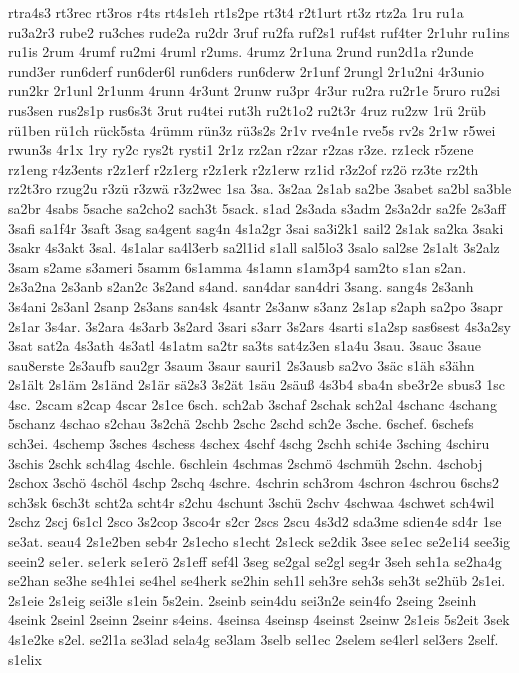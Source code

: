 {rtra4s3
rt3rec
rt3ros
r4ts
rt4s1eh
rt1s2pe
rt3t4
r2t1urt
rt3z
rtz2a
1ru
ru1a
ru3a2r3
rube2
ru3ches
rude2a
ru2dr
3ruf
ru2fa
ruf2s1
ruf4st
ruf4ter
2r1uhr
ru1ins
ru1is
2rum
4rumf
ru2mi
4ruml
r2ums.
4rumz
2r1una
2rund
run2d1a
r2unde
rund3er
run6derf
run6der6l
run6ders
run6derw
2r1unf
2rungl
2r1u2ni
4r3unio
run2kr
2r1unl
2r1unm
4runn
4r3unt
2runw
ru3pr
4r3ur
ru2ra
ru2r1e
5ruro
ru2si
rus3sen
rus2s1p
rus6s3t
3rut
ru4tei
rut3h
ru2t1o2
ru2t3r
4ruz
ru2zw
1rü
2rüb
rü1ben
rü1ch
rück5sta
4rümm
rün3z
rü3s2s
2r1v
rve4n1e
rve5s
rv2s
2r1w
r5wei
rwun3s
4r1x
1ry
ry2c
rys2t
rysti1
2r1z
rz2an
r2zar
r2zas
r3ze.
rz1eck
r5zene
rz1eng
r4z3ents
r2z1erf
r2z1erg
r2z1erk
r2z1erw
rz1id
r3z2of
rz2ö
rz3te
rz2th
rz2t3ro
rzug2u
r3zü
r3zwä
r3z2wec
1sa
3sa.
3s2aa
2s1ab
sa2be
3sabet
sa2bl
sa3ble
sa2br
4sabs
5sache
sa2cho2
sach3t
5sack.
s1ad
2s3ada
s3adm
2s3a2dr
sa2fe
2s3aff
3safi
sa1f4r
3saft
3sag
sa4gent
sag4n
4s1a2gr
3sai
sa3i2k1
sail2
2s1ak
sa2ka
3saki
3sakr
4s3akt
3sal.
4s1alar
sa4l3erb
sa2l1id
s1all
sal5lo3
3salo
sal2se
2s1alt
3s2alz
3sam
s2ame
s3ameri
5samm
6s1amma
4s1amn
s1am3p4
sam2to
s1an
s2an.
2s3a2na
2s3anb
s2an2c
3s2and
s4and.
san4dar
san4dri
3sang.
sang4s
2s3anh
3s4ani
2s3anl
2sanp
2s3ans
san4sk
4santr
2s3anw
s3anz
2s1ap
s2aph
sa2po
3sapr
2s1ar
3s4ar.
3s2ara
4s3arb
3s2ard
3sari
s3arr
3s2ars
4sarti
s1a2sp
sas6sest
4s3a2sy
3sat
sat2a
4s3ath
4s3atl
4s1atm
sa2tr
sa3ts
sat4z3en
s1a4u
3sau.
3sauc
3saue
sau8erste
2s3aufb
sau2gr
3saum
3saur
sauri1
2s3ausb
sa2vo
3säc
s1äh
s3ähn
2s1ält
2s1äm
2s1änd
2s1är
sä2s3
3s2ät
1säu
2säuß
4s3b4
sba4n
sbe3r2e
sbus3
1sc
4sc.
2scam
s2cap
4scar
2s1ce
6sch.
sch2ab
3schaf
2schak
sch2al
4schanc
4schang
5schanz
4schao
s2chau
3s2chä
2schb
2schc
2schd
sch2e
3sche.
6schef.
6schefs
sch3ei.
4schemp
3sches
4schess
4schex
4schf
4schg
2schh
schi4e
3sching
4schiru
3schis
2schk
sch4lag
4schle.
6schlein
4schmas
2schmö
4schmüh
2schn.
4schobj
2schox
3schö
4schöl
4schp
2schq
4schre.
4schrin
sch3rom
4schron
4schrou
6schs2
sch3sk
6sch3t
scht2a
scht4r
s2chu
4schunt
3schü
2schv
4schwaa
4schwet
sch4wil
2schz
2scj
6s1cl
2sco
3s2cop
3sco4r
s2cr
2scs
2scu
4s3d2
sda3me
sdien4e
sd4r
1se
se3at.
seau4
2s1e2ben
seb4r
2s1echo
s1echt
2s1eck
se2dik
3see
se1ec
se2e1i4
see3ig
seein2
se1er.
se1erk
se1erö
2s1eff
sef4l
3seg
se2gal
se2gl
seg4r
3seh
seh1a
se2ha4g
se2han
se3he
se4h1ei
se4hel
se4herk
se2hin
seh1l
seh3re
seh3s
seh3t
se2hüb
2s1ei.
2s1eie
2s1eig
sei3le
s1ein
5s2ein.
2seinb
sein4du
sei3n2e
sein4fo
2seing
2seinh
4seink
2seinl
2seinn
2seinr
s4eins.
4seinsa
4seinsp
4seinst
2seinw
2s1eis
5s2eit
3sek
4s1e2ke
s2el.
se2l1a
se3lad
sela4g
se3lam
3selb
sel1ec
2selem
se4lerl
sel3ers
2self.
s1elix
}
